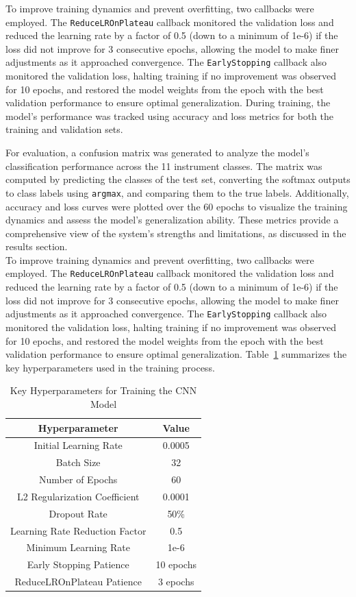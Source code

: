 \documentclass[conference]{IEEEtran}
\begin{document}
To improve training dynamics and prevent overfitting, two callbacks were employed. The \texttt{ReduceLROnPlateau} callback monitored the validation loss and reduced the learning rate by a factor of 0.5 (down to a minimum of 1e-6) if the loss did not improve for 3 consecutive epochs, allowing the model to make finer adjustments as it approached convergence. The \texttt{EarlyStopping} callback also monitored the validation loss, halting training if no improvement was observed for 10 epochs, and restored the model weights from the epoch with the best validation performance to ensure optimal generalization. During training, the model’s performance was tracked using accuracy and loss metrics for both the training and validation sets.

For evaluation, a confusion matrix was generated to analyze the model’s classification performance across the 11 instrument classes. The matrix was computed by predicting the classes of the test set, converting the softmax outputs to class labels using \texttt{argmax}, and comparing them to the true labels. Additionally, accuracy and loss curves were plotted over the 60 epochs to visualize the training dynamics and assess the model’s generalization ability. These metrics provide a comprehensive view of the system’s strengths and limitations, as discussed in the results section. \\[3pt]
To improve training dynamics and prevent overfitting, two callbacks were employed. The \texttt{ReduceLROnPlateau} callback monitored the validation loss and reduced the learning rate by a factor of 0.5 (down to a minimum of 1e-6) if the loss did not improve for 3 consecutive epochs, allowing the model to make finer adjustments as it approached convergence. The \texttt{EarlyStopping} callback also monitored the validation loss, halting training if no improvement was observed for 10 epochs, and restored the model weights from the epoch with the best validation performance to ensure optimal generalization. Table~\ref{tab:hyperparameters} summarizes the key hyperparameters used in the training process.

\begin{table}[h]
\centering
\caption{Key Hyperparameters for Training the CNN Model}
\label{tab:hyperparameters}
\begin{tabular}{|c|c|}
\hline
\textbf{Hyperparameter} & \textbf{Value} \\ \hline
Initial Learning Rate & 0.0005 \\ \hline
Batch Size & 32 \\ \hline
Number of Epochs & 60 \\ \hline
L2 Regularization Coefficient & 0.0001 \\ \hline
Dropout Rate & 50\% \\ \hline
Learning Rate Reduction Factor & 0.5 \\ \hline
Minimum Learning Rate & 1e-6 \\ \hline
Early Stopping Patience & 10 epochs \\ \hline
ReduceLROnPlateau Patience & 3 epochs \\ \hline
\end{tabular}
\end{table}
\end{document}
